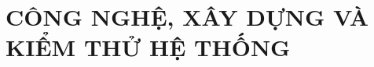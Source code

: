 %

\chapter{CÔNG NGHỆ, XÂY DỰNG VÀ KIỂM THỬ HỆ THỐNG}
\label{chap:congnghe}
\label{chap:cosolythuyet}
\label{chap:xaydung}
\label{chap:ketqua}




